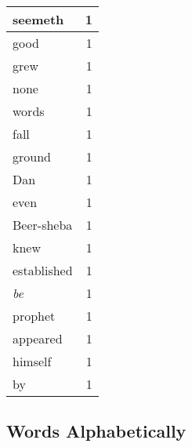 \begin{center}
\begin{longtable}{l|r}
seemeth & 1 \\ \hline
good & 1 \\ \hline
grew & 1 \\ \hline
none & 1 \\ \hline
words & 1 \\ \hline
fall & 1 \\ \hline
ground & 1 \\ \hline
Dan & 1 \\ \hline
even & 1 \\ \hline
Beer-sheba & 1 \\ \hline
knew & 1 \\ \hline
established & 1 \\ \hline
\emph{be} & 1 \\ \hline
prophet & 1 \\ \hline
appeared & 1 \\ \hline
himself & 1 \\ \hline
by & 1 \\ \hline
\end{longtable}
\end{center}



\normalsize



\subsection{Words Alphabetically}

